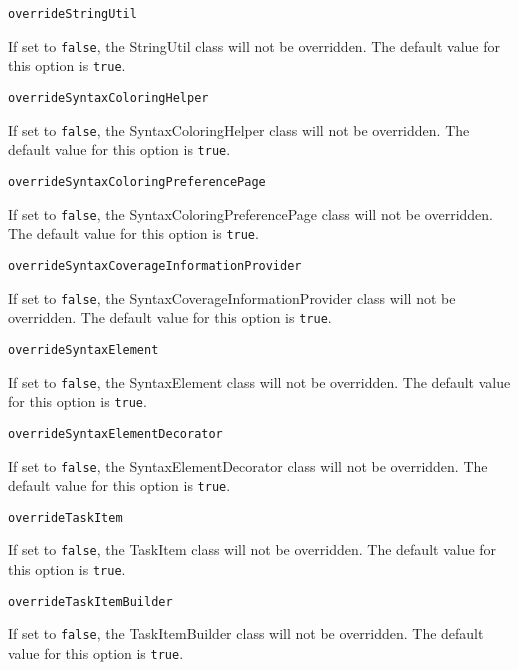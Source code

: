 \noindent\texttt{overrideStringUtil}
\begin{myindentpar}{1cm}
If set to \texttt{false}, the StringUtil class will not be overridden. The default value for this option is \texttt{true}.
\end{myindentpar}

\noindent\texttt{overrideSyntaxColoringHelper}
\begin{myindentpar}{1cm}
If set to \texttt{false}, the SyntaxColoringHelper class will not be overridden. The default value for this option is \texttt{true}.
\end{myindentpar}

\noindent\texttt{overrideSyntaxColoringPreferencePage}
\begin{myindentpar}{1cm}
If set to \texttt{false}, the SyntaxColoringPreferencePage class will not be overridden. The default value for this option is \texttt{true}.
\end{myindentpar}

\noindent\texttt{overrideSyntaxCoverageInformationProvider}
\begin{myindentpar}{1cm}
If set to \texttt{false}, the SyntaxCoverageInformationProvider class will not be overridden. The default value for this option is \texttt{true}.
\end{myindentpar}

\noindent\texttt{overrideSyntaxElement}
\begin{myindentpar}{1cm}
If set to \texttt{false}, the SyntaxElement class will not be overridden. The default value for this option is \texttt{true}.
\end{myindentpar}

\noindent\texttt{overrideSyntaxElementDecorator}
\begin{myindentpar}{1cm}
If set to \texttt{false}, the SyntaxElementDecorator class will not be overridden. The default value for this option is \texttt{true}.
\end{myindentpar}

\noindent\texttt{overrideTaskItem}
\begin{myindentpar}{1cm}
If set to \texttt{false}, the TaskItem class will not be overridden. The default value for this option is \texttt{true}.
\end{myindentpar}

\noindent\texttt{overrideTaskItemBuilder}
\begin{myindentpar}{1cm}
If set to \texttt{false}, the TaskItemBuilder class will not be overridden. The default value for this option is \texttt{true}.
\end{myindentpar}

